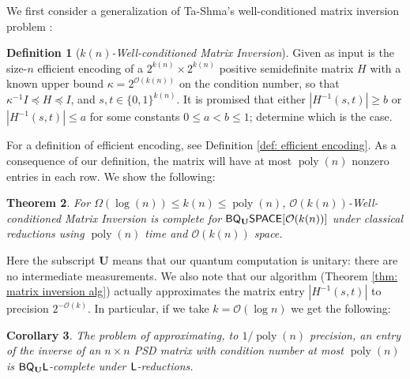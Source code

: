 \documentclass[11pt]{article}
\newtheorem{theorem}{Theorem}
\newtheorem{corollary}[theorem]{Corollary}
\theoremstyle{definition}
\newtheorem{definition}[theorem]{Definition}
\theoremstyle{remark}
\newcommand\Logspace{{\sf{L}}}
\newcommand\matrixinvert[1]{{\ensuremath{#1}}\textit{-Well-conditioned Matrix Inversion}}
\newcommand{\classfont}{\sf}
\newcommand{\Unitary}{\mathbf{U}}
\newcommand{\unitaryBQL}{{\classfont{BQ}_\Unitary\classfont{L}}}
\newcommand{\unitaryBQSPACE}[1]{{\classfont{BQ}_\Unitary\classfont{SPACE}}[#1]}
\newcommand\bigoh{\mathcal{O}}
\DeclareMathOperator{\poly}{poly}
\begin{document}
We first consider a generalization of Ta-Shma's well-conditioned matrix inversion problem \cite{tashma}:\begin{definition}[\matrixinvert{k(n)}] \label{def: matrix invert}
Given as input is the size-$n$ efficient encoding of a $2^{k(n)} \times 2^{k(n)}$ positive semidefinite matrix $H$ with a known upper bound $\kappa = 2^{\mathcal{O}(k(n))}$ on the condition number, so that $\kappa^{-1}I\preceq H \preceq I$, and $s,t\in \lbrace 0,1\rbrace^{k(n)}$. It is promised that either $|H^{-1}(s,t)|\geq b$
 or $|H^{-1}(s,t)|\leq a$ for some constants $0 \le a < b \le 1$; determine which is the case.
 \end{definition}
For a definition of efficient encoding, see Definition \ref{def: efficient encoding}. As a consequence of our definition, the matrix will have at most $\poly(n)$ nonzero entries in each row.
We show the following:
\begin{theorem} \label{thm: matrix invert}
For $\Omega(\log(n)) \le k(n) \le \poly(n)$, \matrixinvert{\mathcal{O}(k(n))} is complete for $\unitaryBQSPACE{\mathcal{O}(k(n))}$ under classical reductions using $\poly(n)$ time and $\mathcal{O}(k(n))$ space.
\end{theorem}

Here the subscript $\Unitary$ means that our quantum computation is unitary: there are no intermediate measurements. We also note that our algorithm (Theorem \ref{thm: matrix inversion alg}) actually approximates the matrix entry $|H^{-1}(s,t)|$ to precision $2^{-\mathcal{O}(k)}$. In particular, if we take $k = \bigoh(\log n)$ we get the following:
\begin{corollary}
The problem of approximating, to $1/\poly(n)$ precision, an entry of the inverse of an $n \times n$ PSD matrix with condition number at most $\poly(n)$ is $\unitaryBQL$-complete under $\Logspace$-reductions.
\end{corollary}
\end{document}
